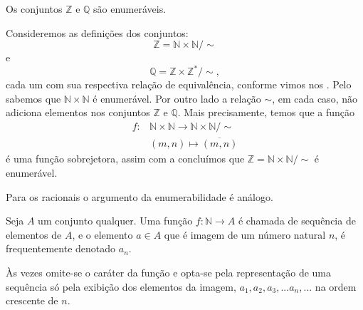 \documentclass[../main.tex]{subfiles}
\begin{document}
\begin{corol}
    Os conjuntos $\mathbb{Z}$ e $\mathbb{Q}$ são enumeráveis.
\end{corol}
\begin{dem}
    Consideremos as definições dos conjuntos:
    \[ \mathbb{Z} = \mathbb{N} \times \mathbb{N}/\sim \]
    e
    \[ \mathbb{Q} = \mathbb{Z} \times \mathbb{Z}^*/\sim, \]
    cada um com sua respectiva relação de equivalência, conforme vimos nos .
    Pelo  sabemos que $\mathbb{N} \times \mathbb{N}$ é enumerável. Por outro lado a relação $\sim$, em cada caso, não adiciona elementos nos conjuntos $\mathbb{Z}$ e $\mathbb{Q}$. Mais precisamente, temos que a função
    \begin{align*}
        f \colon &\mathbb{N} \times \mathbb{N} \to \mathbb{N} \times \mathbb{N} / \sim \\
                & (m,n) \mapsto \overline{(m,n)}
    \end{align*}
    é uma função sobrejetora, assim com a  concluímos que $\mathbb{Z} = \mathbb{N} \times \mathbb{N} / \sim$ é enumerável.

    Para os racionais o argumento da enumerabilidade é análogo.
\end{dem}
\begin{defi}
    Seja $A$ um conjunto qualquer. Uma função $f: \mathbb{N} \to A$ é chamada de sequência de elementos de $A$, e o elemento $a \in A$ que é imagem de um número natural $n$, é frequentemente denotado $a_n$.
\end{defi}
\begin{obs}
    Às vezes omite-se o caráter da função e opta-se pela representação de uma sequência só pela exibição dos elementos da imagem, $a_1, a_2, a_3,...a_n,...$ na ordem crescente de $n$.
\end{obs}
\end{document}
